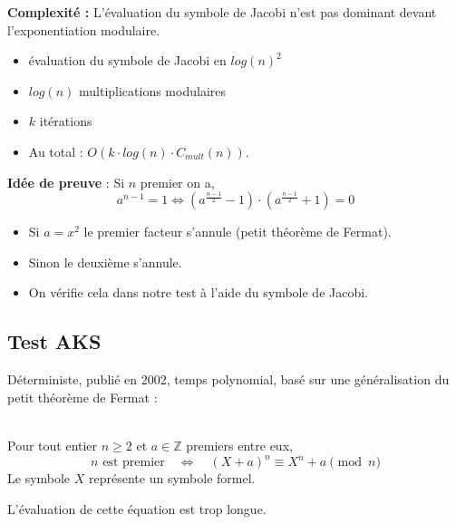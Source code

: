 			\begin{frame}
				\textbf{Complexité :} L'évaluation du symbole de Jacobi n'est pas dominant devant l'exponentiation modulaire.
				\begin{itemize}
				\item évaluation du symbole de Jacobi en $log(n)^{2}$
				\item $log(n)$ multiplications modulaires
				\item $k$ itérations
				\item Au total : $O(k \cdot log(n) \cdot C_{mult}(n))$.
				\end{itemize}
				\textbf{Idée de preuve} : Si $n$ premier on a,
				\[
					a^{n - 1} = 1 \Leftrightarrow (a^{\frac{n - 1}{2}} - 1) \cdot (a^{\frac{n - 1}{2}} + 1) = 0
				\]
				
				\begin{itemize}
				\item Si $a = x^{2}$ le premier facteur s'annule (petit théorème de Fermat).
				\item Sinon le deuxième s'annule.
				\item On vérifie cela dans notre test à l'aide du symbole de Jacobi.
				\end{itemize}
			\end{frame}	
		
		\subsection{Test AKS}	
			\begin{frame}
			Déterministe, publié en 2002, temps polynomial, basé sur une généralisation du petit théorème de Fermat :\\~\\
			\begin{Th}
			\label{ThFermat4}
			Pour tout entier $n \geqslant 2$ et $a \in \mathbb{Z}$ premiers entre eux,
			\[n \text{  est premier} \quad \Leftrightarrow \quad (X + a)^{n} \equiv X^{n} + a \pmod n\] 
			Le symbole $X$ représente un symbole formel.
			\end{Th}
			L'évaluation de cette équation est trop longue.
			\end{frame}
			
